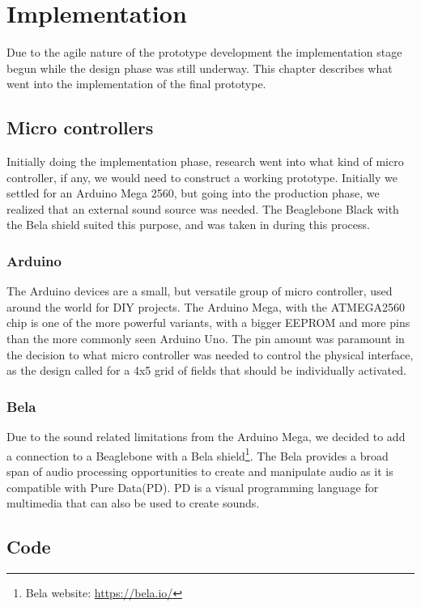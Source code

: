 \chapter{Implementation}%
Due to the agile nature of the prototype development the implementation stage begun while the design phase was still underway. This chapter describes what went into the implementation of the final prototype.

\section{Micro controllers}%
	Initially doing the implementation phase, research went into what kind of micro controller, if any, we would need to construct a working prototype. Initially we settled for an Arduino Mega 2560, but going into the production phase, we realized that an external sound source was needed. The Beaglebone Black with the Bela shield suited this purpose, and was taken in during this process.
	\subsection{Arduino}%
		The Arduino devices are a small, but versatile group of micro controller, used around the world for DIY projects. The Arduino Mega, with the ATMEGA2560 chip is one of the more powerful variants, with a bigger EEPROM and more pins than the more commonly seen Arduino Uno. The pin amount was paramount in the decision to what micro controller was needed to control the physical interface, as the design called for a 4x5 grid of fields that should be individually activated. 
		
	\subsection{Bela}%
		Due to the sound related limitations from the Arduino Mega, we decided to add a connection to a Beaglebone with a Bela shield\footnote{Bela website: \url{https://bela.io/}}. The Bela provides a broad span of audio processing opportunities to create and manipulate audio as it is compatible with Pure Data(PD). PD is a visual programming language for multimedia that can also be used to create sounds.
		
	
\section{Code}
